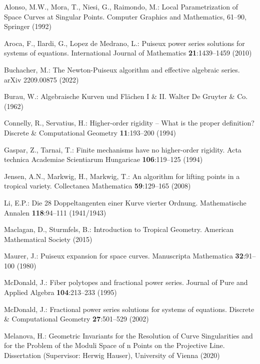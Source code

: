 \documentclass{svproc}
\begin{document}
\begin{thebibliography}{99.}

Alonso, M.W., Mora, T., Niesi, G., Raimondo, M.: Local Parametrization of Space Curves at Singular Points.
Computer Graphics and Mathematics, 61--90, Springer (1992)

Aroca, F., Ilardi, G., Lopez de Medrano, L.: Puiseux power series solutions for systems of equations. 
International Journal of Mathematics \textbf{21}:1439--1459 (2010) %

Buchacher, M.: The Newton-Puiseux algorithm and effective algebraic series. arXiv 2209.00875 (2022)

Burau, W.: Algebraische Kurven und Fl\"achen I \& II. Walter De Gruyter \& Co. (1962)

Connelly, R., Servatius, H.: 
Higher-order rigidity -- What is the proper definition?
Discrete \& Computational Geometry  \textbf{11}:193--200 (1994) %

Gaspar, Z., Tarnai, T.: Finite mechanisms have no higher-order rigidity. 
Acta technica Academiae Scientiarum Hungaricae \textbf{106}:119--125 (1994) %

Jensen, A.N., Markwig, H., Markwig, T.: An algorithm for lifting points in a tropical variety. 
Collectanea Mathematica \textbf{59}:129--165 (2008)

Li, E.P.: Die 28 Doppeltangenten einer Kurve vierter Ordnung. Mathematische Annalen \textbf{118}:94--111 (1941/1943)


Maclagan, D., Sturmfels, B.: Introduction to Tropical Geometry. American Mathematical Society (2015)

Maurer, J.: Puiseux expansion for space curves. Manuscripta Mathematica \textbf{32}:91--100 (1980)

McDonald, J.: Fiber polytopes and fractional power series. Journal of Pure and Applied Algebra
\textbf{104}:213--233 (1995)  %

McDonald, J.: Fractional power series solutions for systems of equations. Discrete \&
Computational Geometry \textbf{27}:501--529 (2002)  %

Melanova, H.: Geometric Invariants for the Resolution of Curve Singularities and for the Problem of the Moduli Space of n Points on the Projective Line. Dissertation (Supervisor: Herwig Hauser), University of Vienna (2020)


\end{thebibliography}
\end{document}
